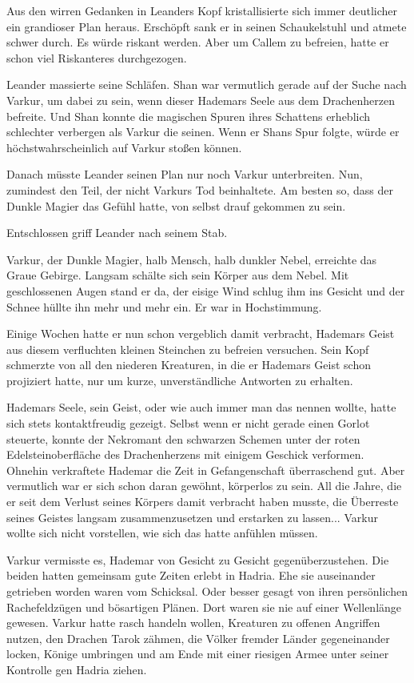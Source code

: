 \documentclass[10pt, a4paper, oneside]{book}
\begin{document}
Aus den wirren Gedanken in Leanders Kopf kristallisierte sich immer deutlicher ein grandioser Plan heraus. Erschöpft sank er in seinen Schaukelstuhl und atmete schwer durch. Es würde riskant werden. Aber um Callem zu befreien, hatte er schon viel Riskanteres durchgezogen.

Leander massierte seine Schläfen. Shan war vermutlich gerade auf der Suche nach Varkur, um dabei zu sein, wenn dieser Hademars Seele aus dem Drachenherzen befreite. Und Shan konnte die magischen Spuren ihres Schattens erheblich schlechter verbergen als Varkur die seinen. Wenn er Shans Spur folgte, würde er höchstwahrscheinlich auf Varkur stoßen können.

Danach müsste Leander seinen Plan nur noch Varkur unterbreiten. Nun, zumindest den Teil, der nicht Varkurs Tod beinhaltete. Am besten so, dass der Dunkle Magier das Gefühl hatte, von selbst drauf gekommen zu sein.

Entschlossen griff Leander nach seinem Stab.\bigskip







Varkur, der Dunkle Magier, halb Mensch, halb dunkler Nebel, erreichte das Graue Gebirge. Langsam schälte sich sein Körper aus dem Nebel. Mit geschlossenen Augen stand er da, der eisige Wind schlug ihm ins Gesicht und der Schnee hüllte ihn mehr und mehr ein. Er war in Hochstimmung.

Einige Wochen hatte er nun schon vergeblich damit verbracht, Hademars Geist aus diesem verfluchten kleinen Steinchen zu befreien versuchen. Sein Kopf schmerzte von all den niederen Kreaturen, in die er Hademars Geist schon projiziert hatte, nur um kurze, unverständliche Antworten zu erhalten.

Hademars Seele, sein Geist, oder wie auch immer man das nennen wollte, hatte sich stets kontaktfreudig gezeigt. Selbst wenn er nicht gerade einen Gorlot steuerte, konnte der Nekromant den schwarzen Schemen unter der roten Edelsteinoberfläche des Drachenherzens mit einigem Geschick verformen. Ohnehin verkraftete Hademar die Zeit in Gefangenschaft überraschend gut. Aber vermutlich war er sich schon daran gewöhnt, körperlos zu sein. All die Jahre, die er seit dem Verlust seines Körpers damit verbracht haben musste, die Überreste seines Geistes langsam zusammenzusetzen und erstarken zu lassen... Varkur wollte sich nicht vorstellen, wie sich das hatte anfühlen müssen.

Varkur vermisste es, Hademar von Gesicht zu Gesicht gegenüberzustehen. Die beiden hatten gemeinsam gute Zeiten erlebt in Hadria. Ehe sie auseinander getrieben worden waren vom Schicksal. Oder besser gesagt von ihren persönlichen Rachefeldzügen und bösartigen Plänen. Dort waren sie nie auf einer Wellenlänge gewesen. Varkur hatte rasch handeln wollen, Kreaturen zu offenen Angriffen nutzen, den Drachen Tarok zähmen, die Völker fremder Länder gegeneinander locken, Könige umbringen und am Ende mit einer riesigen Armee unter seiner Kontrolle gen Hadria ziehen.
\end{document}
